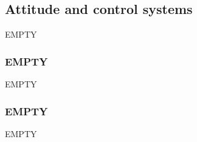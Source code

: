 \subsection{Attitude and control systems}

EMPTY

\subsubsection{EMPTY}
EMPTY
\subsubsection{EMPTY}
EMPTY
